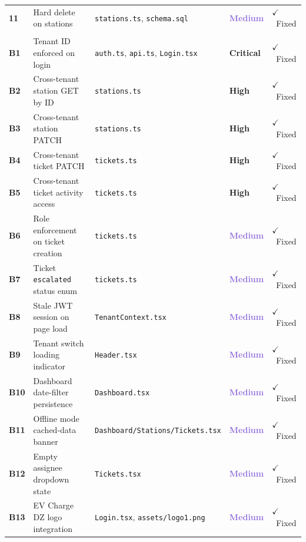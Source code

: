 \documentclass[12pt,a4paper]{report}
\newcommand{\critical}{\textcolor{criticalred}{\textbf{Critical}}}
\newcommand{\high}{\textcolor{highorange}{\textbf{High}}}
\newcommand{\medium}{\textcolor{mediumpurple}{\textbf{Medium}}}
\newcommand{\fixed}{\textcolor{greenfg}{$\checkmark$~Fixed}}
\newcommand{\file}[1]{\texttt{\small #1}}
\begin{document}
\begin{longtable}{
			>{\centering\bfseries}p{0.5cm}
			p{4.0cm}
			p{4.2cm}
			p{1.9cm}
			p{1.6cm}
		}
		\rowcolor{rowalt}
		11 & Hard delete on stations &
		\file{stations.ts}, \file{schema.sql} &
		\medium & \fixed \\

		\multicolumn{5}{l}{\cellcolor{lightblue}\textbf{\color{brandblue}
		Additional Fixes \& Improvements --- May 2026}} \\

		B1 & Tenant ID enforced on login &
		\file{auth.ts}, \file{api.ts}, \file{Login.tsx} &
		\critical & \fixed \\

		\rowcolor{rowalt}
		B2 & Cross-tenant station GET by ID &
		\file{stations.ts} &
		\high & \fixed \\

		B3 & Cross-tenant station PATCH &
		\file{stations.ts} &
		\high & \fixed \\

		\rowcolor{rowalt}
		B4 & Cross-tenant ticket PATCH &
		\file{tickets.ts} &
		\high & \fixed \\

		B5 & Cross-tenant ticket activity access &
		\file{tickets.ts} &
		\high & \fixed \\

		\rowcolor{rowalt}
		B6 & Role enforcement on ticket creation &
		\file{tickets.ts} &
		\medium & \fixed \\

		B7 & Ticket \texttt{escalated} status enum &
		\file{tickets.ts} &
		\medium & \fixed \\

		\rowcolor{rowalt}
		B8 & Stale JWT session on page load &
		\file{TenantContext.tsx} &
		\medium & \fixed \\

		B9 & Tenant switch loading indicator &
		\file{Header.tsx} &
		\medium & \fixed \\

		\rowcolor{rowalt}
		B10 & Dashboard date-filter persistence &
		\file{Dashboard.tsx} &
		\medium & \fixed \\

		B11 & Offline mode cached-data banner &
		\file{Dashboard/Stations/Tickets.tsx} &
		\medium & \fixed \\

		\rowcolor{rowalt}
		B12 & Empty assignee dropdown state &
		\file{Tickets.tsx} &
		\medium & \fixed \\

		B13 & EV Charge DZ logo integration &
		\file{Login.tsx}, \file{assets/logo1.png} &
		\medium & \fixed \\

	\end{longtable}
	
\end{document}
